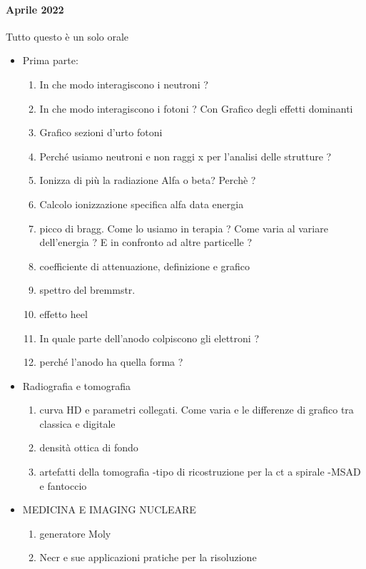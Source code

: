\documentclass[../main.tex]{subfiles}
\begin{document}
\paragraph{Aprile 2022}
Tutto questo è un solo orale
\begin{itemize}
    \item Prima parte: 
    \begin{enumerate}
        \item In che modo interagiscono i neutroni ?
        \item In che modo interagiscono i fotoni ? Con Grafico degli effetti dominanti
        \item Grafico sezioni d'urto fotoni
        \item Perché usiamo neutroni e non raggi x per l'analisi delle strutture ?
        \item Ionizza di più la radiazione Alfa o beta?  Perchè ?
        \item Calcolo ionizzazione specifica alfa data energia 
        \item picco di bragg. Come lo usiamo in terapia ? Come varia al variare dell'energia ? E in confronto ad altre particelle ?
        \item coefficiente di attenuazione, definizione e grafico 
        \item spettro del bremmstr.
        \item effetto heel 
        \item In quale parte dell'anodo colpiscono gli elettroni ?
        \item perché l'anodo ha quella forma ?
    \end{enumerate}
    \item Radiografia e tomografia
    \begin{enumerate}
        \item curva HD e parametri collegati. Come varia e le differenze di grafico tra classica e digitale 
        \item densità ottica di fondo 
        \item artefatti della tomografia
        -tipo di ricostruzione per la ct a spirale
        -MSAD e fantoccio 
    \end{enumerate}
    \item MEDICINA E IMAGING NUCLEARE
    \begin{enumerate}
        \item generatore Moly
        \item Necr e sue applicazioni pratiche per la risoluzione

\end{enumerate}
\end{itemize}
\end{document}
